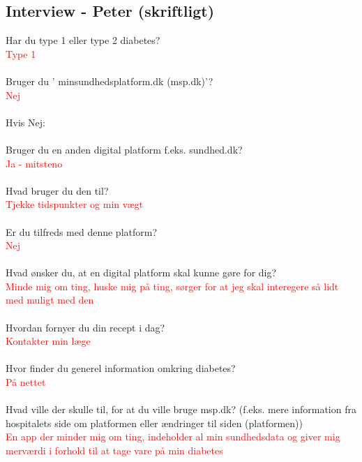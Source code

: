 \subsection{Interview - Peter (skriftligt)}
Har du type 1 eller type 2 diabetes?\\
\textcolor{red}{Type 1}
\\ \\
Bruger  du ’ minsundhedsplatform.dk (msp.dk)’?\\
\textcolor{red}{Nej}
\\ \\
Hvis Nej:
\\ \\
Bruger du en anden digital platform f.eks. sundhed.dk?\\
\textcolor{red}{Ja - mitsteno}
\\ \\
Hvad bruger du den til?\\
\textcolor{red}{Tjekke tidspunkter og min vægt}
\\ \\
Er du tilfreds med denne platform?\\
\textcolor{red}{Nej}
\\ \\
Hvad ønsker du, at en digital platform skal kunne gøre for dig?\\
\textcolor{red}{Minde mig om ting, huske mig på ting, sørger for at jeg skal interegere så lidt med muligt med den}
\\ \\
Hvordan fornyer du din recept i dag?\\
\textcolor{red}{Kontakter min læge}
\\ \\
Hvor finder du generel information omkring diabetes?\\
\textcolor{red}{På nettet}
\\ \\
Hvad ville der skulle til, for at du ville bruge msp.dk? (f.eks. mere information fra hospitalets side om platformen eller ændringer til siden (platformen))\\
\textcolor{red}{En app der minder mig om ting, indeholder al min sundhedsdata og giver mig merværdi i forhold til at tage vare på min diabetes}
